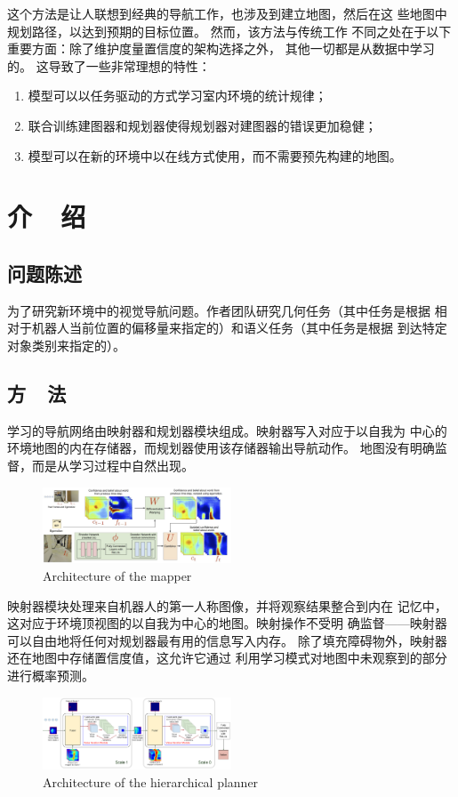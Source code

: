 \documentclass{thuemp}
\begin{document}
  这个方法是让人联想到经典的导航工作，也涉及到建立地图，然后在这
  些地图中规划路径，以达到预期的目标位置。 然而，该方法与传统工作
  不同之处在于以下重要方面：除了维护度量置信度的架构选择之外，
  其他一切都是从数据中学习的。 这导致了一些非常理想的特性：
  \begin{enumerate}
    \item 模型可以以任务驱动的方式学习室内环境的统计规律；
    \item 联合训练建图器和规划器使得规划器对建图器的错误更加稳健；
    \item 模型可以在新的环境中以在线方式使用，而不需要预先构建的地图。
  \end{enumerate}
\section{介~~绍}
\subsection{问题陈述}
为了研究新环境中的视觉导航问题。作者团队研究几何任务（其中任务是根据
相对于机器人当前位置的偏移量来指定的）和语义任务（其中任务是根据
到达特定对象类别来指定的）。
\subsection{方~~法}
学习的导航网络由映射器和规划器模块组成。映射器写入对应于以自我为
中心的环境地图的内在存储器，而规划器使用该存储器输出导航动作。
地图没有明确监督，而是从学习过程中自然出现。
\begin{figure}[h]
  \centering
  \includegraphics[width=0.5\textwidth]{image/2.jpg}
  \caption{Architecture of the mapper}
  \label{fig:map}
\end{figure}

映射器模块处理来自机器人的第一人称图像，并将观察结果整合到内在
记忆中，这对应于环境顶视图的以自我为中心的地图。映射操作不受明
确监督——映射器可以自由地将任何对规划器最有用的信息写入内存。
除了填充障碍物外，映射器还在地图中存储置信度值，这允许它通过
利用学习模式对地图中未观察到的部分进行概率预测。
\begin{figure}[h]
  \centering
  \includegraphics[width=0.5\textwidth]{image/3.png}
  \caption{Architecture of the hierarchical planner}
  \label{fig:plan}
\end{figure}
\end{document}
